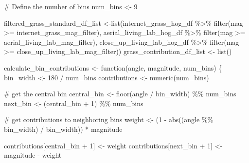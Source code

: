 \documentclass[
  letterpaper,
  DIV=11,
  numbers=noendperiod]{scrreprt}
\newenvironment{Shaded}{\begin{snugshade}}{\end{snugshade}}
\newcommand{\CommentTok}[1]{\textcolor[rgb]{0.37,0.37,0.37}{#1}}
\newcommand{\ControlFlowTok}[1]{\textcolor[rgb]{0.00,0.23,0.31}{#1}}
\newcommand{\DecValTok}[1]{\textcolor[rgb]{0.68,0.00,0.00}{#1}}
\newcommand{\FunctionTok}[1]{\textcolor[rgb]{0.28,0.35,0.67}{#1}}
\newcommand{\NormalTok}[1]{\textcolor[rgb]{0.00,0.23,0.31}{#1}}
\newcommand{\OtherTok}[1]{\textcolor[rgb]{0.00,0.23,0.31}{#1}}
\newcommand{\SpecialCharTok}[1]{\textcolor[rgb]{0.37,0.37,0.37}{#1}}
\begin{document}
\begin{Shaded}
\begin{Highlighting}[]
\CommentTok{\# Define the number of bins}
\NormalTok{num\_bins }\OtherTok{\textless{}{-}} \DecValTok{9}

\NormalTok{filtered\_grass\_standard\_df\_list }\OtherTok{\textless{}{-}}\FunctionTok{list}\NormalTok{(internet\_grass\_hog\_df }\SpecialCharTok{\%\textgreater{}\%}
                                          \FunctionTok{filter}\NormalTok{(mag }\SpecialCharTok{\textgreater{}=}\NormalTok{ internet\_grass\_mag\_filter),}
\NormalTok{                                        aerial\_living\_lab\_hog\_df }\SpecialCharTok{\%\textgreater{}\%}
                                          \FunctionTok{filter}\NormalTok{(mag }\SpecialCharTok{\textgreater{}=}\NormalTok{ aerial\_living\_lab\_mag\_filter), }
\NormalTok{                                        close\_up\_living\_lab\_hog\_df }\SpecialCharTok{\%\textgreater{}\%}
                                          \FunctionTok{filter}\NormalTok{(mag }\SpecialCharTok{\textgreater{}=}\NormalTok{ close\_up\_living\_lab\_mag\_filter))}
\NormalTok{grass\_contribution\_df\_list }\OtherTok{\textless{}{-}} \FunctionTok{list}\NormalTok{()}


\NormalTok{calculate\_bin\_contributions }\OtherTok{\textless{}{-}} \ControlFlowTok{function}\NormalTok{(angle, magnitude, num\_bins) \{}
\NormalTok{  bin\_width }\OtherTok{\textless{}{-}} \DecValTok{180} \SpecialCharTok{/}\NormalTok{ num\_bins}
\NormalTok{  contributions }\OtherTok{\textless{}{-}} \FunctionTok{numeric}\NormalTok{(num\_bins)}
  
  \CommentTok{\# get the central bin}
\NormalTok{  central\_bin }\OtherTok{\textless{}{-}} \FunctionTok{floor}\NormalTok{(angle }\SpecialCharTok{/}\NormalTok{ bin\_width) }\SpecialCharTok{\%\%}\NormalTok{ num\_bins}
\NormalTok{  next\_bin }\OtherTok{\textless{}{-}}\NormalTok{ (central\_bin }\SpecialCharTok{+} \DecValTok{1}\NormalTok{) }\SpecialCharTok{\%\%}\NormalTok{ num\_bins}
  
  \CommentTok{\# get contributions to neighboring bins}
\NormalTok{  weight }\OtherTok{\textless{}{-}}\NormalTok{ (}\DecValTok{1} \SpecialCharTok{{-}} \FunctionTok{abs}\NormalTok{((angle }\SpecialCharTok{\%\%}\NormalTok{ bin\_width) }\SpecialCharTok{/}\NormalTok{ bin\_width)) }\SpecialCharTok{*}\NormalTok{ magnitude}
  
\NormalTok{  contributions[central\_bin }\SpecialCharTok{+} \DecValTok{1}\NormalTok{] }\OtherTok{\textless{}{-}}\NormalTok{ weight}
\NormalTok{  contributions[next\_bin }\SpecialCharTok{+} \DecValTok{1}\NormalTok{] }\OtherTok{\textless{}{-}}\NormalTok{ magnitude }\SpecialCharTok{{-}}\NormalTok{ weight}
  

\end{Highlighting}
\end{Shaded}
\end{document}
